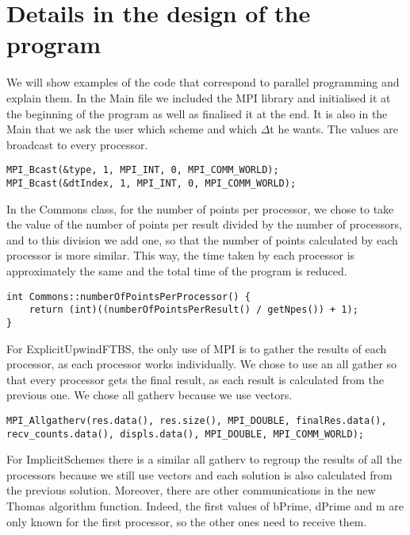 \documentclass [10 pt, a4 paper]{report}
\begin{document}
\section{Details in the design of the program}
We will show examples of the code that correspond to parallel programming and explain them. In the Main file we included the MPI library and initialised it at the beginning of the program as well as finalised it at the end. It is also in the Main that we ask the user which scheme and which $\Delta$t he wants. The values are broadcast to every processor.

\begin{lstlisting}[caption=Call of broadcast in the Main, label={lst:code1}, frame=single]
MPI_Bcast(&type, 1, MPI_INT, 0, MPI_COMM_WORLD);
MPI_Bcast(&dtIndex, 1, MPI_INT, 0, MPI_COMM_WORLD);
\end{lstlisting}

\noindent
In the Commons class, for the number of points per processor, we chose to take the value of the number of points per result divided by the number of processors, and to this division we add one, so that the number of points calculated by each processor is more similar. This way, the time taken by each processor is approximately the same and the total time of the program is reduced.

\begin{lstlisting}[caption=numberOfPointsPerProcessor() in Commons, label={lst:code1}, frame=single]
int Commons::numberOfPointsPerProcessor() {
	return (int)((numberOfPointsPerResult() / getNpes()) + 1);
}
\end{lstlisting}

\clearpage
\noindent
For ExplicitUpwindFTBS, the only use of MPI is to gather the results of each processor, as each processor works individually. We chose to use an all gather so that every processor gets the final result, as each result is calculated from the previous one. We chose all gatherv because we use vectors.

\begin{lstlisting}[caption=Gather function in ExplicitUpwindFTBS, label={lst:code1}, frame=single]
MPI_Allgatherv(res.data(), res.size(), MPI_DOUBLE, finalRes.data(), 
recv_counts.data(), displs.data(), MPI_DOUBLE, MPI_COMM_WORLD);
\end{lstlisting}

\noindent
For ImplicitSchemes there is a similar all gatherv to regroup the results of all the processors because we still use vectors and each solution is also calculated from the previous solution. Moreover, there are other communications in the new Thomas algorithm function. Indeed, the first values of bPrime, dPrime and m are only known for the first processor, so the other ones need to receive them.
\end{document}
